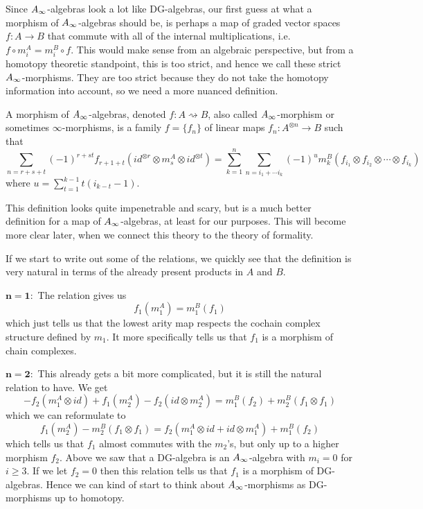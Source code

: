 Since $\A$-algebras look a lot like DG-algebras, our first guess at what a morphism of $\A$-algebras should be, is perhaps a map of graded vector spaces $f:A\longrightarrow B$ that commute with all of the internal multiplications, i.e. $f\circ m^A_i = m^B_i\circ f$. This would make sense from an algebraic perspective, but from a homotopy theoretic standpoint, this is too strict, and hence we call these strict $\A$-morphisms. They are too strict because they do not take the homotopy information into account, so we need a more nuanced definition. 

\begin{definition}[$\A$-morphism]
\label{def:A_infinity-morphism}
A morphism of $\A$-algebras, denoted $f:A\rightsquigarrow B$, also called $\A$-morphism or sometimes $\infty$-morphisms, is a family $f=\{f_n\}$ of linear maps $f_n:A^{\otimes n}\rightarrow B$ such that 
\begin{equation*}
    \sum_{n = r+s+t}(-1)^{r+st}f_{r+1+t}(id^{\otimes r}\otimes m_s^A \otimes id^{\otimes t}) = \sum_{k=1}^{n}\sum_{n=i_1+\cdots i_k}(-1)^{u} m_k^B(f_{i_1}\otimes f_{i_2}\otimes \cdots \otimes f_{i_k})
\end{equation*}
where $u=\displaystyle \sum_{t=1}^{k-1}t(i_{k-t}-1)$.
\end{definition}

This definition looks quite impenetrable and scary, but is a much better definition for a map of $\A$-algebras, at least for our purposes. This will become more clear later, when we connect this theory to the theory of formality.  

If we start to write out some of the relations, we quickly see that the definition is very natural in terms of the already present products in $A$ and $B$. 

$\mathbf{n=1:}$ The relation gives us
\begin{equation*}
    f_1(m_1^A) = m_1^B(f_1)
\end{equation*}
which just tells us that the lowest arity map respects the cochain complex structure defined by $m_1$. It more specifically tells us that $f_1$ is a morphism of chain complexes. 

$\mathbf{n=2:}$ This already gets a bit more complicated, but it is still the natural relation to have. We get
\begin{equation*}
    -f_2(m_1^A\otimes id)+f_1(m_2^A)-f_2(id\otimes m_2^A) = m_1^B(f_2)+m_2^B(f_1\otimes f_1)
\end{equation*}
which we can reformulate to 
\begin{equation*}
    f_1(m_2^A)-m_2^B(f_1\otimes f_1) = f_2(m_1^A\otimes id + id\otimes m_1^A) + m_1^B(f_2)
\end{equation*}
which tells us that $f_1$ almost commutes with the $m_2$'s, but only up to a higher morphism $f_2$. Above we saw that a DG-algebra is an $\A$-algebra with $m_i=0$ for $i\geq 3$. If we let $f_2=0$ then this relation tells us that $f_1$ is a morphism of DG-algebras. Hence we can kind of start to think about $\A$-morphisms as DG-morphisms up to homotopy.  

